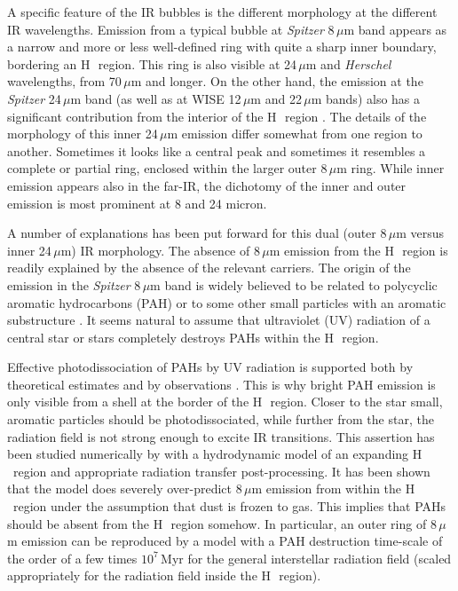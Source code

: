 \documentclass[a4paper,fleqn,usenatbib]{mnras}
\newcommand{\hii}    {H\,{\sc{ii}}~}
\begin{document}
A specific feature of the IR bubbles is the different morphology at the different IR wavelengths. Emission from a typical bubble at {\em Spitzer} 8\,$\mu$m band appears as a narrow and more or less well-defined ring with quite a sharp inner boundary, bordering an \hii region. This ring is also visible at 24\,$\mu$m and {\em Herschel} wavelengths, from 70\,$\mu$m and longer. On the other hand, the emission at the {\em Spitzer} 24\,$\mu$m band (as well as at WISE 12\,$\mu$m and 22\,$\mu$m bands) also has a significant contribution from the interior of the \hii region \citep{deharveng_10}. The details of the morphology of this inner 24\,$\mu$m emission differ somewhat from one region to another. Sometimes it looks like a central peak and sometimes it resembles a complete or partial ring, enclosed within the larger outer 8\,$\mu$m ring. While inner emission appears also in the far-IR, the dichotomy of the inner and outer emission is most prominent at 8 and 24 micron.

A number of explanations has been put forward for this dual (outer 8\,$\mu$m versus inner 24\,$\mu$m) IR morphology. The absence of 8\,$\mu$m emission from the \hii region is readily explained by the absence of the relevant carriers. The origin of the emission in the {\em Spitzer} 8\,$\mu$m band is widely believed to be related to polycyclic aromatic hydrocarbons (PAH) or to some other small particles with an aromatic substructure \citep[see e.g.][]{KwokZhang,Jones2013}. It seems natural to assume that ultraviolet (UV) radiation of a central star or stars completely destroys PAHs within the \hii region.

Effective photodissociation of PAHs by UV radiation is supported both by theoretical estimates \citep[e.g.][]{Allain1996} and by observations \citep{Giard1994}. This is why bright PAH emission is only visible from a shell at the border of the \hii region. Closer to the star small, aromatic particles should be photodissociated, while further from the star, the radiation field is not strong enough to excite IR transitions. This assertion has been studied numerically by \cite{PavlyuchenkovAR} with a hydrodynamic model of an expanding \hii region and appropriate radiation transfer post-processing. It has been shown that the model does severely over-predict 8\,$\mu$m emission from within the \hii region under the assumption that dust is frozen to gas. This implies that PAHs should be absent from the \hii region somehow. In particular, an outer ring of 8\,$\mu$m emission can be reproduced by a model with a PAH destruction time-scale of the order of a few times $10^7$\,Myr for the general interstellar radiation field \citep{mmp83} (scaled appropriately for the radiation field inside the \hii region).  
\end{document}
